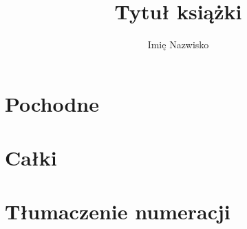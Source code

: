 \documentclass[9pt, twoside, a5paper]{extbook}
\author{Imię Nazwisko}
\title{Tytuł książki}
\theoremstyle{remark}
\begin{document}






\chapter{Pochodne}


\chapter{Całki}









\chapter{Tłumaczenie numeracji}


{}

\end{document}
